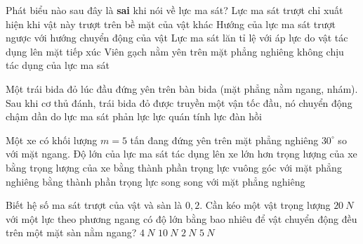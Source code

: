 \begin{ex}%
Phát biểu nào sau đây là \textbf{sai} khi nói về lực ma sát?
\choice
{Lực ma sát trượt chỉ xuất hiện khi vật này trượt trên bề mặt của vật khác}
{Hướng của lực ma sát trượt ngược với hướng chuyển động của vật}
{Lực ma sát lăn tỉ lệ với áp lực do vật tác dụng lên mặt tiếp xúc}
{\True Viên gạch nằm yên trên mặt phẳng nghiêng không chịu tác dụng của lực ma sát}
 \end{ex}
\begin{ex}%
Một trái bida đỏ lúc đầu đứng yên trên bàn bida (mặt phẳng nằm ngang, nhám). Sau khi cơ thủ đánh, trái bida đỏ được truyền một vận tốc đầu, nó chuyển động chậm dần do
\choice
{\True lực ma sát}
{phản lực}
{lực quán tính}
{lực đàn hồi}
 \end{ex}
\begin{ex}%
Một xe có khối lượng $m=5$ tấn đang đứng yên trên mặt phẳng nghiêng $30^\circ$ so với mặt ngang. Độ lớn của lực ma sát tác dụng lên xe
\choice
{lớn hơn trọng lượng của xe}
{bằng trọng lượng của xe}
{bằng thành phần trọng lực vuông góc với mặt phẳng nghiêng}
{\True bằng thành phần trọng lực song song với mặt phẳng nghiêng}
\loigiai{}
\end{ex}
\begin{ex}%
\loigiai{}
\end{ex} 
\begin{ex}%
Biết hệ số ma sát trượt của vật và sàn là $0,2$. Cần kéo một vật trọng lượng $20\ N$ với một lực theo phương ngang có độ lớn bằng bao nhiêu để vật chuyển động đều trên một mặt sàn nằm ngang?  
\choice
{\True $4\ N$}
{$10\ N$}
{$2\ N$}
{$5\ N$}
 \end{ex}
